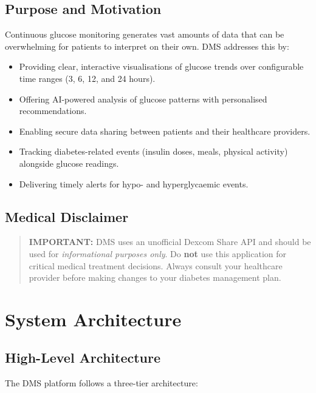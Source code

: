 \documentclass[12pt,a4paper]{article}
\begin{document}
\subsection{Purpose and Motivation}

Continuous glucose monitoring generates vast amounts of data that can be overwhelming for patients to interpret on their own. DMS addresses this by:
\begin{itemize}
    \item Providing clear, interactive visualisations of glucose trends over configurable time ranges (3, 6, 12, and 24 hours).
    \item Offering AI-powered analysis of glucose patterns with personalised recommendations.
    \item Enabling secure data sharing between patients and their healthcare providers.
    \item Tracking diabetes-related events (insulin doses, meals, physical activity) alongside glucose readings.
    \item Delivering timely alerts for hypo- and hyperglycaemic events.
\end{itemize}

\subsection{Medical Disclaimer}

\begin{quote}
\textbf{IMPORTANT:} DMS uses an unofficial Dexcom Share API and should be used for \textit{informational purposes only}. Do \textbf{not} use this application for critical medical treatment decisions. Always consult your healthcare provider before making changes to your diabetes management plan.
\end{quote}

\section{System Architecture}

\subsection{High-Level Architecture}

The DMS platform follows a three-tier architecture:
\end{document}

